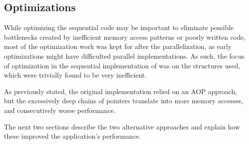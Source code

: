 \subsection{Optimizations}
\label{sec:seq:optimizations}


While optimizing the sequential code may be important to eliminate possible bottlenecks created by inefficient memory access patterns or poorly written code, most of the optimization work was kept for after the parallelization, as early optimizations might have difficulted parallel implementations.
As such, the focus of optimization in the sequential implementation of \polu was on the structures used, which were trivially found to be very inefficient.

As previously stated, the original implementation relied on an AOP approach, but the excessively deep chains of pointers translate into more memory accesses, and consecutively worse performance.

The next two sections describe the two alternative approaches and explain how these improved the application's performance.





